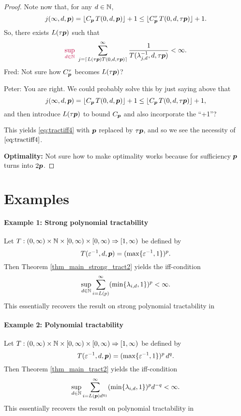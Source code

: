 \documentclass[11pt,a4paper]{article}
\newcommand{\fred}[1]{\begingroup\color{blue}#1\endgroup}
\newcommand{\peter}[1]{\begingroup\color{purple}#1\endgroup}
\begin{document}
\begin{proof}
Note now that, \peter{for any $d\in\mathbb{N}$,}
\[
 j(\infty,d,\boldsymbol{p}) = \lfloor C_{\boldsymbol{p}}\, T(0,d,\boldsymbol{p})\rfloor +1 \le \lfloor C_{\boldsymbol{p}}^\tau\, T(0,d,\tau \boldsymbol{p})\rfloor +1.
\]
So, there exists $L(\tau \boldsymbol{p})$ such that
\[
\peter{\sup_{d\in\naturals}}\,\, \sum_{j=\lceil L(\tau \vp) T(0,d,\tau \vp)\rceil}^\infty \frac{1}{T(\lambda_{j,d}^{-1},d, \tau\vp)}<\infty.
\]
\fred{Fred:  Not sure how $C_{\boldsymbol{p}}^\tau$ becomes $L(\tau \boldsymbol{p})$?}

\peter{Peter: You are right. We could probably solve this by just saying above that 
\[
 j(\infty,d,\boldsymbol{p}) = \lfloor C_{\boldsymbol{p}}\, T(0,d,\boldsymbol{p})\rfloor +1 \le \lfloor C_{\boldsymbol{p}}\, T(0,d,\tau \boldsymbol{p})\rfloor +1,
\]
and then introduce $L(\tau \boldsymbol{p})$ to bound $C_{\boldsymbol{p}}$ and also incorporate the ``+1''?
}

This yields \eqref{eq:tractiff4} with $\boldsymbol{p}$ replaced by $\tau \boldsymbol{p}$, and so we see the necessity of $\eqref{eq:tractiff4}$.

\bigskip

\noindent \textbf{Optimality:}
\fred{Not sure how to make optimality works because for sufficiency $\boldsymbol{p}$ turns into $2\boldsymbol{p}$.}

\end{proof}


\section{Examples}

\paragraph{Example 1: Strong polynomial tractability}

Let $T: (0,\infty) \times \mathbb{N} \times [0,\infty) \times [0,\infty)\Rightarrow [1,\infty)$
be defined by
\[
 T(\varepsilon^{-1},d,\boldsymbol{p})= (\max\{\varepsilon^{-1},1\})^p .
\]
Then Theorem \ref{thm_main_strong_tract2} yields the iff-condition
\[
 \sup_{d\in\mathbb{N}} \sum_{i=L(p)}^\infty (\min\{\lambda_{i,d},1\})^p < \infty.
\]
This essentially recovers the result on strong polynomial tractability in \cite[Theorem 5.1]{NW08}

\paragraph{Example 2: Polynomial tractability}

Let $T: (0,\infty) \times \mathbb{N} \times [0,\infty) \times [0,\infty)\Rightarrow [1,\infty)$
be defined by
\[
 T(\varepsilon^{-1},d,\boldsymbol{p})= (\max\{\varepsilon^{-1},1\})^p\, d^q.
\]
Then Theorem \ref{thm_main_tract2} yields the iff-condition
\[
 \sup_{d\in\mathbb{N}} \sum_{i=L(\boldsymbol{p}) d^{q_1}}^\infty (\min\{\lambda_{i,d},1\})^p d^{-q} < \infty.
\]
This essentially recovers the result on polynomial tractability in \cite[Theorem 5.1]{NW08}
\end{document}
